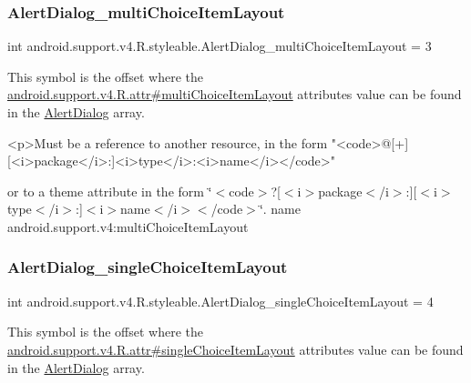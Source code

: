 \subsubsection{\texorpdfstring{Alert\+Dialog\+\_\+multi\+Choice\+Item\+Layout}{AlertDialog\_multiChoiceItemLayout}}
{\footnotesize\ttfamily int android.\+support.\+v4.\+R.\+styleable.\+Alert\+Dialog\+\_\+multi\+Choice\+Item\+Layout = 3\hspace{0.3cm}{\ttfamily [static]}}

This symbol is the offset where the \hyperlink{classandroid_1_1support_1_1v4_1_1R_1_1attr_a3ae545489edf2089f9aeb66fc5c69707}{android.\+support.\+v4.\+R.\+attr\#multi\+Choice\+Item\+Layout} attribute\textquotesingle{}s value can be found in the \hyperlink{classandroid_1_1support_1_1v4_1_1R_1_1styleable_a5116e3c5b33ab9db032c1574d2588f5e}{Alert\+Dialog} array.

\begin{DoxyVerb}      <p>Must be a reference to another resource, in the form "<code>@[+][<i>package</i>:]<i>type</i>:<i>name</i></code>"
\end{DoxyVerb}
 or to a theme attribute in the form \char`\"{}$<$code$>$?\mbox{[}$<$i$>$package$<$/i$>$\+:\mbox{]}\mbox{[}$<$i$>$type$<$/i$>$\+:\mbox{]}$<$i$>$name$<$/i$>$$<$/code$>$\char`\"{}.  name android.\+support.\+v4\+:multi\+Choice\+Item\+Layout \mbox{\label{classandroid_1_1support_1_1v4_1_1R_1_1styleable_ad05c2beadd3ba3e9770f1f84ec112b92}} 
\subsubsection{\texorpdfstring{Alert\+Dialog\+\_\+single\+Choice\+Item\+Layout}{AlertDialog\_singleChoiceItemLayout}}
{\footnotesize\ttfamily int android.\+support.\+v4.\+R.\+styleable.\+Alert\+Dialog\+\_\+single\+Choice\+Item\+Layout = 4\hspace{0.3cm}{\ttfamily [static]}}

This symbol is the offset where the \hyperlink{classandroid_1_1support_1_1v4_1_1R_1_1attr_a120fb3dc6f6858a1beef845f5ca49097}{android.\+support.\+v4.\+R.\+attr\#single\+Choice\+Item\+Layout} attribute\textquotesingle{}s value can be found in the \hyperlink{classandroid_1_1support_1_1v4_1_1R_1_1styleable_a5116e3c5b33ab9db032c1574d2588f5e}{Alert\+Dialog} array.

